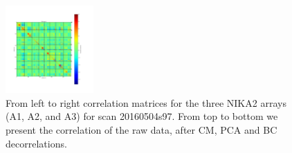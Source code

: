 \begin{figure}[ht]
\begin{center}
\includegraphics[width=0.3\textwidth]{Figures/DarkTests/corrmat_TOI_BC_array_3_20160504s97.pdf}
\end{center}
\caption{From left to right correlation matrices for the three NIKA2 arrays (A1, A2, and A3) for scan 20160504s97. From top to bottom we present the correlation of the raw data, after CM, PCA and BC decorrelations. \label{corrs97}}
\end{figure}


